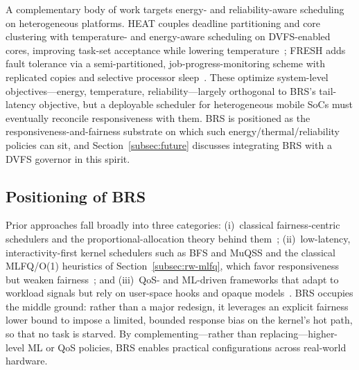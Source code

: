 A complementary body of work targets energy- and reliability-aware scheduling on heterogeneous platforms. HEAT couples deadline partitioning and core clustering with temperature- and energy-aware scheduling on DVFS-enabled cores, improving task-set acceptance while lowering temperature~\cite{Sharma2022HEAT}; FRESH adds fault tolerance via a semi-partitioned, job-progress-monitoring scheme with replicated copies and selective processor sleep~\cite{Moulik2024FRESH}. These optimize system-level objectives---energy, temperature, reliability---largely orthogonal to BRS's tail-latency objective, but a deployable scheduler for heterogeneous mobile SoCs must eventually reconcile responsiveness with them. BRS is positioned as the responsiveness-and-fairness substrate on which such energy/thermal/reliability policies can sit, and Section~\ref{subsec:future} discusses integrating BRS with a DVFS governor in this spirit.

\subsection{Positioning of BRS}
Prior approaches fall broadly into three categories: (i)~classical fairness-centric schedulers and the proportional-allocation theory behind them~\cite{241774,4624248}; (ii)~low-latency, interactivity-first kernel schedulers such as BFS and MuQSS and the classical MLFQ/O(1) heuristics of Section~\ref{subsec:rw-mlfq}, which favor responsiveness but weaken fairness~\cite{10306992,4663063}; and (iii)~QoS- and ML-driven frameworks that adapt to workload signals but rely on user-space hooks and opaque models~\cite{7426385,8338088,Zhang2025Tail}. BRS occupies the middle ground: rather than a major redesign, it leverages an explicit fairness lower bound to impose a limited, bounded response bias on the kernel's hot path, so that no task is starved. By complementing---rather than replacing---higher-level ML or QoS policies, BRS enables practical configurations across real-world hardware.
